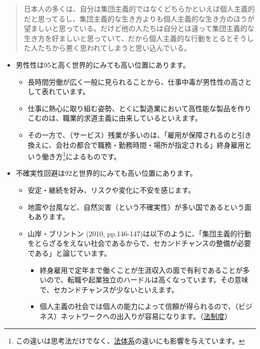 \documentclass[
]{book}
\begin{document}
\begin{quote}
日本人の多くは、自分は集団主義的ではなくどちらかといえば個人主義的だと思ってるし、集団主義的な生き方よりも個人主義的な生き方のほうが望ましいと思っている。だけど他の人たちは自分とは違って集団主義的な生き方を好ましいと思っていて、だから個人主義的な行動をとるとそうした人たちから悪く思われてしまうと思い込んでいる。
\end{quote}

\begin{itemize}
\item
  男性性は95と高く世界的にみても高い位置にあります。

  \begin{itemize}
  \item
    長時間労働が広く一般に見られることから、仕事中毒が男性性の高さとして表れています。
  \item
    仕事に熱心に取り組む姿勢、とくに製造業において高性能な製品を作りこむのは、職業的求道主義に由来しているといえます。
  \item
    その一方で、（サービス）残業が多いのは、「雇用が保障されるのと引き換えに、会社の都合で職務・勤務時間・場所が指定される」終身雇用という働き方\footnote{この違いは思考法だけでなく、\protect\hyperlink{law}{法体系}の違いにも影響を与えています。}によるものです。
  \end{itemize}
\end{itemize}

\begin{itemize}
\item
  不確実性回避は92と世界的にみても高い位置にあります。

  \begin{itemize}
  \item
    安定・継続を好み、リスクや変化に不安を感じます。
  \item
    地震や台風など、自然災害（という不確実性）が多い国であるという面もあります。
  \item
    山岸・ブリントン (2010, pp.146-147)は以下のように、「集団主義的行動をとらざるをえない社会であるからで、セカンドチャンスの整備が必要である」と論じています。

    \begin{itemize}
    \item
      終身雇用で定年まで働くことが生涯収入の面で有利であることが多いので、転職や起業独立のハードルは高くなっています。その意味で、セカンドチャンスが少ないといえます。
    \item
      個人主義の社会では個人の能力によって信頼が得られるので、（ビジネス）ネットワークへの出入りが容易になります。（\protect\hyperlink{law}{法制度}）
    \end{itemize}
  \end{itemize}
\end{itemize}
\end{document}

